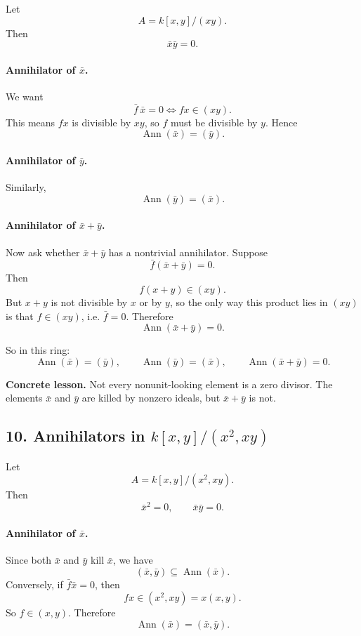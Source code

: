 \documentclass[12pt,a4paper,oneside]{report}
\DeclareMathOperator{\Ann}{Ann}
\theoremstyle{notespace}
\begin{document}
	Let
	\[
	A=k[x,y]/(xy).
	\]
	Then
	\[
	\bar x\bar y=0.
	\]
	
	\paragraph{Annihilator of \(\bar x\).}
	We want
	\[
	\bar f\,\bar x=0
	\iff
	fx\in (xy).
	\]
	This means \(fx\) is divisible by \(xy\), so \(f\) must be divisible by \(y\). Hence
	\[
	\Ann(\bar x)=(\bar y).
	\]
	
	\paragraph{Annihilator of \(\bar y\).}
	Similarly,
	\[
	\Ann(\bar y)=(\bar x).
	\]
	
	\paragraph{Annihilator of \(\bar x+\bar y\).}
	Now ask whether \(\bar x+\bar y\) has a nontrivial annihilator. Suppose
	\[
	\bar f(\bar x+\bar y)=0.
	\]
	Then
	\[
	f(x+y)\in (xy).
	\]
	But \(x+y\) is not divisible by \(x\) or by \(y\), so the only way this product lies in \((xy)\) is that \(f\in (xy)\), i.e. \(\bar f=0\). Therefore
	\[
	\Ann(\bar x+\bar y)=0.
	\]
	
	So in this ring:
	\[
	\Ann(\bar x)=(\bar y),\qquad
	\Ann(\bar y)=(\bar x),\qquad
	\Ann(\bar x+\bar y)=0.
	\]
	
	\medskip
	
	\noindent
	\textbf{Concrete lesson.}
	Not every nonunit-looking element is a zero divisor. The elements \(\bar x\) and \(\bar y\) are killed by nonzero ideals, but \(\bar x+\bar y\) is not.
	
	\subsection{10. Annihilators in \(k[x,y]/(x^2,xy)\)}
	
	Let
	\[
	A=k[x,y]/(x^2,xy).
	\]
	Then
	\[
	\bar x^2=0,\qquad \bar x\bar y=0.
	\]
	
	\paragraph{Annihilator of \(\bar x\).}
	Since both \(\bar x\) and \(\bar y\) kill \(\bar x\), we have
	\[
	(\bar x,\bar y)\subseteq \Ann(\bar x).
	\]
	Conversely, if \(\bar f\bar x=0\), then
	\[
	fx\in (x^2,xy)=x(x,y).
	\]
	So \(f\in (x,y)\). Therefore
	\[
	\Ann(\bar x)=(\bar x,\bar y).
	\]
	
\end{document}
